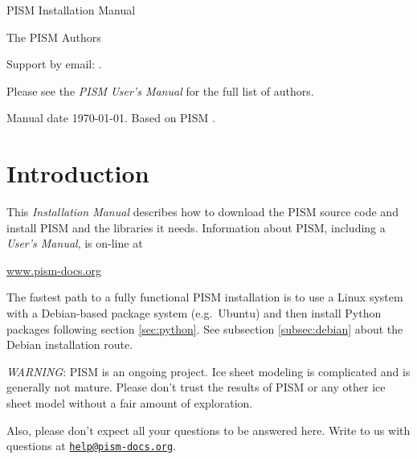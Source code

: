 \documentclass[titlepage,letterpaper,final]{scrartcl}
\begin{document}
\begin{titlepage}

  \begin{center}
    \vspace*{3.5cm}
    {\huge{} PISM Installation Manual}
    \vspace{0.5cm}

    {\Large The PISM Authors}
    \vspace{1cm}
  \end{center}

\setcounter{tocdepth}{3}
\small
\tableofcontents
\normalsize

\vspace{0.3in}

  \begin{center}
    \small Support by email: \PISMEMAIL.

    \medskip
    Please see the \emph{PISM User's Manual} for the full list of authors.

    \medskip
    Manual date \today.  Based on PISM \PISMREV.

    \medskip
    \PISMDOWNLOADMSG
 \end{center}

\end{titlepage}

\section*{Introduction}

\large
This \emph{Installation Manual} describes how to download the PISM source code and install PISM and the libraries it needs.  Information about PISM, including a \emph{User's Manual}, is on-line at
\bigskip
\begin{center}
  \href{http://www.pism-docs.org}{www.pism-docs.org}
\end{center}
\bigskip
\noindent The fastest path to a fully functional PISM installation is to use a Linux system with a Debian-based package system (e.g.~Ubuntu) and then install Python packages following section \ref{sec:python}.  See subsection \ref{subsec:debian} about the Debian installation route.

\vfill

\large
\begin{center}
\parbox{5.5in}{ \emph{WARNING}:  PISM is an ongoing project.  Ice sheet modeling is complicated and is generally not mature.  Please don't trust the results of PISM or any other ice sheet model without a fair amount of exploration.

\bigskip
Also, please don't expect all your questions to be answered here.  Write to us with questions at \href{mailto:help@pism-docs.org}{\texttt{help@pism-docs.org}}.}
\normalsize
\end{center}
\normalsize
\vfill
\end{document}
